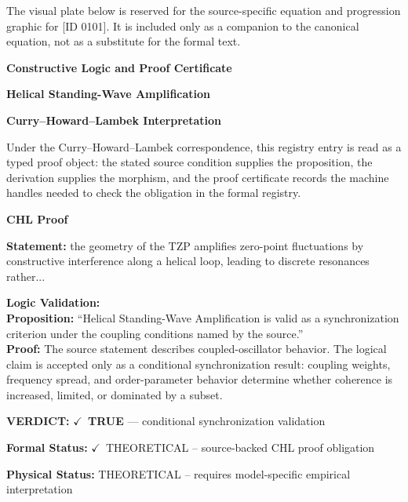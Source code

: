 \begingroup\footnotesize\sloppy
The visual plate below is reserved for the source-specific equation and progression graphic for [ID 0101]. It is included only as a companion to the canonical equation, not as a substitute for the formal text.
\par\endgroup
\ifTZPDarkEdition
{}
\fi

\clearpage
\begingroup\tzpsupportsetup
\noindent\textbf{\fontsize{10.8pt}{12.8pt}\selectfont [ID 0101] Constructive Logic and Proof Certificate}\par
\noindent\textbf{\fontsize{10pt}{12pt}\selectfont Helical Standing-Wave Amplification}\par
\vspace{0.45em}
\begingroup
\footnotesize
\setlength{\parskip}{0.22em}
\setlength{\parindent}{0pt}
\noindent\textbf{Curry--Howard--Lambek Interpretation}\par
Under the Curry--Howard--Lambek correspondence, this registry entry is read as a typed proof
object: the stated source condition supplies the proposition, the derivation supplies the
morphism, and the proof certificate records the machine handles needed to check the obligation
in the formal registry.

\vspace{0.45em}
\noindent\textbf{CHL Proof}\par
\textbf{Statement:} the geometry of the TZP amplifies zero-point fluctuations by constructive interference
along a helical loop, leading to discrete resonances rather...

\textbf{Logic Validation:}\\
\textbf{Proposition:} ``Helical Standing-Wave Amplification is valid as a synchronization criterion under the
coupling conditions named by the source.''\\
\textbf{Proof:} The source statement describes coupled-oscillator behavior. The logical claim is
accepted only as a conditional synchronization result: coupling weights, frequency
spread, and order-parameter behavior determine whether coherence is increased, limited,
or dominated by a subset.

\textbf{VERDICT:} \ensuremath{\checkmark}\ \textbf{TRUE} --- conditional synchronization validation

\textbf{Formal Status:} \ensuremath{\checkmark}\ THEORETICAL -- source-backed CHL proof obligation

\textbf{Physical Status:} THEORETICAL -- requires model-specific empirical interpretation
\par\vspace{0.45em}
\par
\ifTZPDarkEdition
{}
\fi
\endgroup
\endgroup
